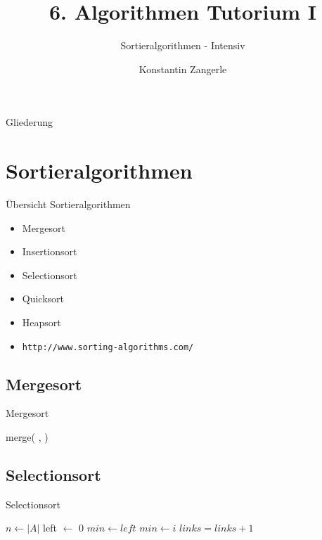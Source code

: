 \documentclass[18pt]{beamer}
\title[Algo I Tut]{6. Algorithmen Tutorium I}
\subtitle{Sortieralgorithmen - Intensiv}
\author[Zangerle]{Konstantin Zangerle}
\institute{Institut für Theoretische Informatik}
\begin{document}

\begin{frame}
\titlepage
\end{frame}

\begin{frame}{Gliederung}
 \tableofcontents
\end{frame}

\section{Sortieralgorithmen}
\begin{frame}[fragile]{Übersicht Sortieralgorithmen}
 \begin{itemize}
  \item Mergesort
  \item Insertionsort
  \item Selectionsort
  \item Quicksort
  \item Heapsort
  \item \verb|http://www.sorting-algorithms.com/|
 \end{itemize}

\end{frame}

\subsection{Mergesort}
\begin{frame}[fragile]{Mergesort}
\begin{algorithmic}
     
    \Else
      \State \Return merge(
      ,
      )
   \EndIf
  
   
 \EndFunction
\end{algorithmic}

\end{frame}

\subsection{Selectionsort}
\begin{frame}[fragile]{Selectionsort}
\begin{algorithmic}
 \State $n \gets |A|$
 \State left $\gets$ 0
 \Repeat
   \State $min \gets left$
      \State $min \gets i$
    \EndIf
   \EndFor
   \State {}
   \State $links = links + 1$
 \EndProcedure
\end{algorithmic}


\end{frame}
\end{document}
